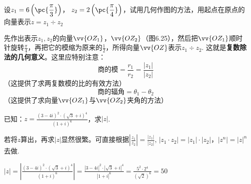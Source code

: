 \begin{example}
设$z_1=6\left(\pc{\frac{\pi}{3}}\right)$，
$z_2=2\left(\pc{\frac{\pi}{4}}\right)$，试用几何作图的方法，用起点在原点的向量表示$z=z_1\div z_2$
\end{example}

\noindent
\begin{minipage}{.55\textwidth}
\begin{solution}
先作出表示$z_1,z_2$的向量$\vv{OZ_1}$，$\vv{OZ_2}$（图6.25），然后把$\vv{OZ_1}$顺时针旋转$\frac{\pi}{4}$，再把它的模缩为原来的$\frac{1}{2}$，所得向量$\vv{OZ}$表示$z_1\div z_2$. 这就是\textbf{复数除法的几何意义}。这里应特别注意：
\[\text{商的模}=\frac{r_1}{r_2}=\frac{|z_1|}{|z_2|}\]
（这提供了求两复数模的比的有效方法）
\[\text{商的辐角}=\theta_1-\theta_2\]
（这提供了求向量$\vv{OZ_1}$与$\vv{OZ_2}$夹角的方法）
\end{solution}    
\end{minipage}\hfill
\begin{minipage}{.4\textwidth}
\centering
{}
\end{minipage}

\begin{example}
    已知：$z=\frac{(3-4i)^2\cdot (\sqrt{3}+i)^4}{(1+i)^6}$，求$|z|$.
\end{example}

\begin{analyze}
若将$z$算出，再求$|z|$显然很繁。可直接根据$\left|\frac{z_1}{z_2}\right|=\frac{|z_1|}{|z_2|}$, $|z_1\cdot z_2|=|z_1|\cdot |z_2|$，$|z^n|=|z|^n$去做.    
\end{analyze}

\begin{solution}
$|z|=\left|\frac{(3-4i)^2\cdot (\sqrt{3}+i)^4}{(1+i)^6}\right|=\frac{|3-4i|^2\cdot \left|\sqrt{3}+i\right|^4}{|1+i|^6}=\frac{5^2\cdot 2^4}{\left(\sqrt{2}\right)^6}=50
$    
\end{solution}

